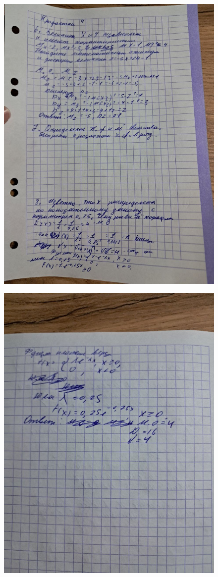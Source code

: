 \documentclass{article}
\begin{document}
\begin{figure}[H]
    \centering
    \includegraphics[width=1\linewidth]{photo_5323477539961828019_y.jpg}
\end{figure}

\begin{figure}[H]
    \centering
    \includegraphics[width=1\linewidth]{photo_5323477539961828020_y.jpg}
\end{figure}
\end{document}

